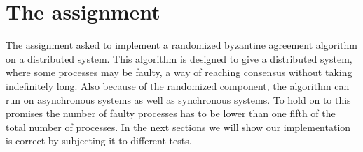 \section{The assignment}

The assignment asked to implement a randomized byzantine agreement algorithm on a distributed system.
This algorithm is designed to give a distributed system, where some processes may be faulty, a way of reaching consensus without taking indefinitely long.
Also because of the randomized component, the algorithm can run on asynchronous systems as well as synchronous systems.
To hold on to this promises the number of faulty processes has to be lower than one fifth of the total number of processes. 
In the next sections we will show our implementation is correct by subjecting it to different tests.
